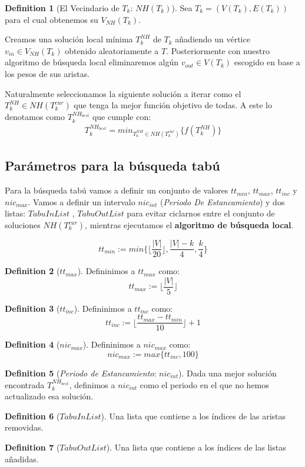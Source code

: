 \documentclass[letter,10pt]{article}
\theoremstyle{definition}
\newtheorem{definition}{Definition}[section]
\begin{document}
\begin{definition}[El Vecindario de $T_k$: $NH(T_k)$] Sea $T_k =(V(T_k),E(T_k))$ para el cual obtenemos su $V_{NH}(T_k)$. 

Creamos una solución local mínima $T^{NH}_k$ de $T_k$ añadiendo un vértice $v_{in}\in V_{NH}(T_k)$ obtenido aleatoriamente a $T$. Posteriormente con nuestro algoritmo de búsqueda local eliminaremos algún $v_{out}\in V(T_k)$ escogido en base a los pesos de sus aristas.
\end{definition}

Naturalmente seleccionamos la siguiente solución a iterar como el $T^{NH}_k \in NH(T^{cur}_k)$ que tenga la mejor función objetivo de todas. A este lo denotamos como $T^{NH_{best}}_k$ que cumple con:
\begin{align}
    T^{NH_{best}}_k = min_{T^{NH}_k \in NH(T^{cur}_k) }\{ f(T^{NH}_k)\}
\end{align}


\subsection{Parámetros para la búsqueda tabú}

Para la búsqueda tabú vamos a definir un conjunto de valores $tt_{min}$, $tt_{max}$, $tt_{inc}$ y $nic_{max}$. Vamos a definir un intervalo $nic_{int}$ (\textit{Periodo De Estancamiento}) y dos listas: $TabuInList$ , $TabuOutList$ para evitar ciclarnos entre el conjunto de soluciones $NH(T^{cur}_k)$, mientras ejecutamos el \textbf{algoritmo de búsqueda local}.

\[ tt_{min} := min \Big \{ \Big \lfloor\frac{|V|}{20} \Big \rfloor, \frac{|V|-k}{4}, \frac{k}{4} \Big \} \]
\begin{definition}[$tt_{max}$] Defininimos a $tt_{max}$ como:
\[ tt_{max} := \Big \lfloor\frac{|V|}{5} \Big \rfloor \]
\end{definition}
\begin{definition}[$tt_{inc}$] Defininimos a $tt_{inc}$ como:
\[ tt_{inc} := \Big \lfloor\frac{tt_{max}-tt_{min}}{10}\Big \rfloor +1\]
\end{definition}
\begin{definition}[$nic_{max}$] Defininimos a $nic_{max}$ como:
\[ nic_{max} := max\{ tt_{inc} , 100\}\]
\end{definition}
\begin{definition}[\textit{Periodo de Estancamiento}: $nic_{int}$]
Dada una mejor solución encontrada $T^{NH_{best}}_{k}$, definimos a $nic_{int}$ como el periodo en el que no hemos actualizado esa solución.
\end{definition}
\begin{definition}[$TabuInList$]
Una lista que contiene a los índices de las aristas removidas.
\end{definition}
\begin{definition}[$TabuOutList$]
Una lista que contiene a los índices de las listas añadidas.
\end{definition}
\end{document}
